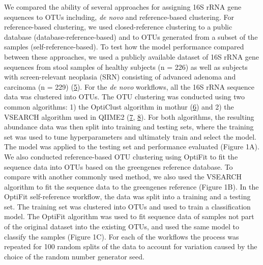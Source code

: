 \documentclass[
]{article}
\begin{document}
We compared the ability of several approaches for assigning 16S rRNA
gene sequences to OTUs including, \emph{de novo} and reference-based
clustering. For reference-based clustering, we used closed-reference
clustering to a public database (database-reference-based) and to OTUs
generated from a subset of the samples (self-reference-based). To test
how the model performance compared between these approaches, we used a
publicly available dataset of 16S rRNA gene sequences from stool samples
of healthy subjects (n = 226) as well as subjects with screen-relevant
neoplasia (SRN) consisting of advanced adenoma and carcinoma (n = 229)
(\protect\hyperlink{ref-baxter2016}{5}). For the \emph{de novo}
workflows, all the 16S rRNA sequence data was clustered into OTUs. The
OTU clustering was conducted using two common algorithms: 1) the
OptiClust algorithm in mothur (\protect\hyperlink{ref-westcott2017}{6})
and 2) the VSEARCH algorithm used in QIIME2
(\protect\hyperlink{ref-rognes2016}{7},
\protect\hyperlink{ref-bolyen2019}{8}). For both algorithms, the
resulting abundance data was then split into training and testing sets,
where the training set was used to tune hyperparameters and ultimately
train and select the model. The model was applied to the testing set and
performance evaluated (Figure 1A). We also conducted reference-based OTU
clustering using OptiFit to fit the sequence data into OTUs based on the
greengenes reference database. To compare with another commonly used
method, we also used the VSEARCH algorithm to fit the sequence data to
the greengenes reference (Figure 1B). In the OptiFit self-reference
workflow, the data was split into a training and a testing set. The
training set was clustered into OTUs and used to train a classification
model. The OptiFit algorithm was used to fit sequence data of samples
not part of the original dataset into the existing OTUs, and used the
same model to classify the samples (Figure 1C). For each of the
workflows the process was repeated for 100 random splits of the data to
account for variation caused by the choice of the random number
generator seed.
\end{document}
